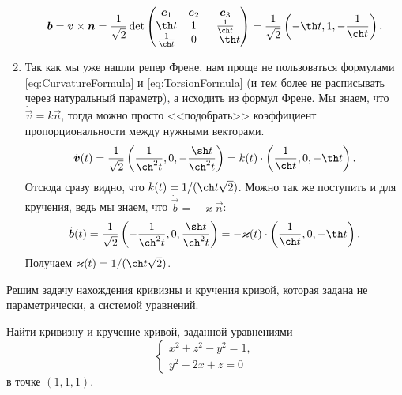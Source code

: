\begin{solution}
\begin{enumerate}[nolistsep, label=(\arabic*)]
			\[
				\vec{b} = \vec{v} \times \vec{n} = \frac{1}{\sqrt{2}}\det
				\begin{pmatrix}
					\vec{e}_1 & \vec{e}_2 & \vec{e}_3\\
					\th t & 1 & \frac{1}{\ch t}\\
					\frac{1}{\ch t} & 0 & -\th t
				\end{pmatrix} = \frac{1}{\sqrt{2}}\br{-\th t, 1, -\frac{1}{\ch t}}.
			\]
		\item Так как мы уже нашли репер Френе, нам проще не пользоваться формулами \eqref{eq:CurvatureFormula} и \eqref{eq:TorsionFormula} (и тем более не расписывать через натуральный параметр), а исходить из формул Френе. Мы знаем, что $\dot{\vec{v}} = k\vec{n}$, тогда можно просто <<подобрать>> коэффициент пропорциональности между нужными векторами.
			\[
				\dot{\vec{v}}(t) = \frac{1}{\sqrt{2}}\br{\frac{1}{\ch^2t}, 0, -\frac{\sh t}{\ch^2t}} = k(t) \cdot \br{\frac{1}{\ch t}, 0, -\th t}.
			\]
			Отсюда сразу видно, что $k(t) = 1 / (\ch t\sqrt{2})$. Можно так же поступить и для кручения, ведь мы знаем, что $\dot{\vec{b}} = -\varkappa\vec{n}$:
			\[
				\dot{\vec{b}}(t) = \frac{1}{\sqrt{2}}\br{-\frac{1}{\ch^2t}, 0, \frac{\sh t}{\ch^2t}} = -\varkappa(t) \cdot \br{\frac{1}{\ch t}, 0, -\th t}.
			\]
			Получаем $\varkappa(t) = 1 / (\ch t\sqrt{2})$.
	\end{enumerate}
\end{solution}

Решим задачу нахождения кривизны и кручения кривой, которая задана не параметрически, а системой уравнений.

\begin{problem}
	Найти кривизну и кручение кривой, заданной уравнениями
	\[
		\begin{cases}
			x^2 + z^2 - y^2 = 1,\\
			y^2 - 2x + z = 0
		\end{cases}
	\]
	в точке $(1, 1, 1)$.
\end{problem}

